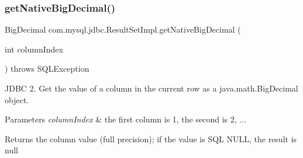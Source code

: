\subsubsection{\texorpdfstring{get\+Native\+Big\+Decimal()}{getNativeBigDecimal()}\hspace{0.1cm}{\footnotesize\ttfamily [1/2]}}
{\footnotesize\ttfamily Big\+Decimal com.\+mysql.\+jdbc.\+Result\+Set\+Impl.\+get\+Native\+Big\+Decimal (\begin{DoxyParamCaption}\item[{int}]{column\+Index }\end{DoxyParamCaption}) throws S\+Q\+L\+Exception\hspace{0.3cm}{\ttfamily [protected]}}

J\+D\+BC 2. Get the value of a column in the current row as a java.\+math.\+Big\+Decimal object.


\begin{DoxyParams}{Parameters}
{\em column\+Index} & the first column is 1, the second is 2, ...\\
\hline
\end{DoxyParams}
\begin{DoxyReturn}{Returns}
the column value (full precision); if the value is S\+QL N\+U\+LL, the result is null
\end{DoxyReturn}

